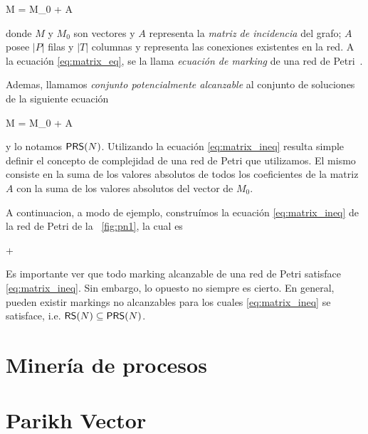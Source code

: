 M = M_0 + A \cdot \widehat\sigma 
\eeq

donde $M$ y $M_0$ son vectores y $A$ representa la \emph{matriz de incidencia}
del grafo; $A$ posee $|P|$ filas y $|T|$ columnas y representa las conexiones 
existentes en la red.
A la ecuación \eqref{eq:matrix_eq}, se la llama \emph{ecuación de marking} de una red
de Petri~\cite{Murata89}.

Ademas, llamamos \emph{conjunto potencialmente alcanzable}
al conjunto de soluciones de la siguiente ecuación

M = M_0 + A \cdot \widehat\sigma {}
\eeq

y lo notamos $\textsf{PRS}(N)$.
Utilizando la ecuación \eqref{eq:matrix_ineq} resulta simple definir el concepto
de complejidad de una red de Petri que utilizamos. El mismo consiste en la suma
de los valores absolutos de todos los coeficientes de la matriz $A$ con la suma
de los valores absolutos del vector de $M_0$.

A continuacion, a modo de ejemplo, construímos la ecuación \eqref{eq:matrix_ineq} de
la red de Petri de la ~\autoref{fig:pn1}, la cual es

\beq
 \left[\begin{array}{c} 1 \\ 6 \end{array} \right] +
\left[\begin{array}{rr} 1 & -1 \\ -2 & 3 \end{array} \right]
\cdot
{}
\geq \left[\begin{array}{c} 0 \\ 0 \end{array} \right]
\eeq

Es importante ver que todo marking alcanzable de una red de Petri
satisface \eqref{eq:matrix_ineq}. Sin embargo, lo opuesto no siempre es cierto.
En general, pueden existir markings no alcanzables para
los cuales \eqref{eq:matrix_ineq} se satisface, i.e. $\textsf{RS}(N) \subseteq \textsf{PRS}(N)$.

\section{Minería de procesos} 
\label{sec:2.process mining}

\section{Parikh Vector} 
\label{sec:2.parikh}

